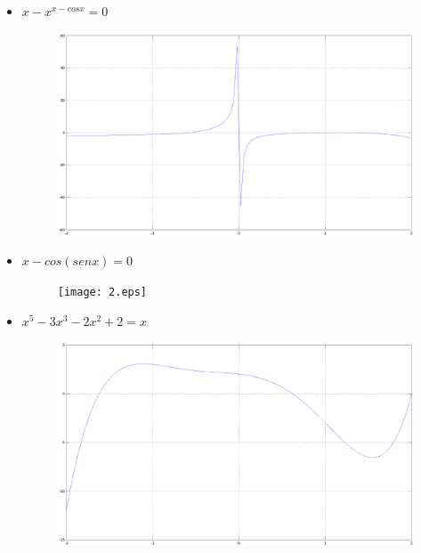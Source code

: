 \documentclass[a4paper,12pt]{article}
\begin{document}
    \begin{itemize}
     \item $x-x^{x-cosx} = 0$
     
     \begin{figure}[h]
      \centering
      \includegraphics[scale = 0.3]{1.eps}
     \end{figure}

     \newpage
     
     \item $x-cos(senx) = 0$
     
     \begin{figure}[h]
      \centering
      \texttt{[image: 2.eps]}
     \end{figure}
     
     
     \item $x^5 - 3x^3 - 2x^2 + 2 = x$
     
     \begin{figure}[h]
      \centering
      \includegraphics[scale = 0.3]{3.eps}
     \end{figure}
    \end{itemize}
\end{document}
